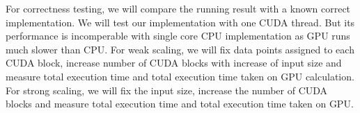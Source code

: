 \documentclass{article}
\begin{document}
For correctness testing,
we will compare the running result with a known correct
implementation. We will test our
implementation with one CUDA thread. But its performance is
incomperable with single core CPU implementation as GPU runs much
slower than CPU. For weak scaling, we will fix data points assigned to
each CUDA block, increase number of CUDA blocks with increase of
input size and measure total execution time and total execution time taken
on GPU calculation. For strong scaling, we will fix the input size,
increase the number of CUDA blocks and measure total execution
time and total execution time taken on GPU. 



\end{document}
